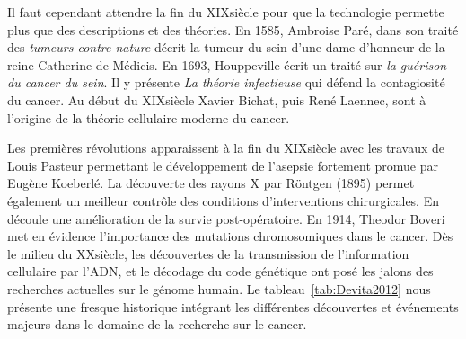       Il faut cependant attendre la fin du XIX\eme siècle pour que la technologie permette plus que des descriptions et des théories.
      En 1585, Ambroise Paré, dans son traité des \emph{tumeurs contre nature} décrit la tumeur du sein d'une dame d'honneur de la reine Catherine de Médicis.
      En 1693, Houppeville écrit un traité sur \emph{la guérison du cancer du sein}.
      Il y présente \emph{La théorie infectieuse} qui défend la contagiosité du cancer.
      Au début du XIX\eme siècle Xavier Bichat, puis René Laennec, sont à l'origine de la théorie cellulaire moderne du cancer.

      Les premières révolutions apparaissent à la fin du XIX\eme siècle avec les travaux de Louis Pasteur permettant le développement de l'asepsie fortement promue par Eugène Koeberlé.
      La découverte des rayons X par Röntgen (1895) permet également un meilleur contrôle des conditions d'interventions chirurgicales.
      En découle une amélioration de la survie post-opératoire.
      En 1914, Theodor Boveri met en évidence l'importance des mutations chromosomiques dans le cancer.
      Dès le milieu du XX\eme siècle, les découvertes de la transmission de l'information cellulaire par l'\acs{ADN}, et le décodage du code génétique ont posé les jalons des recherches actuelles sur le génome humain.
      Le tableau~\ref{tab:Devita2012} nous présente une fresque historique intégrant les différentes découvertes et événements majeurs dans le domaine de la recherche sur le cancer.

